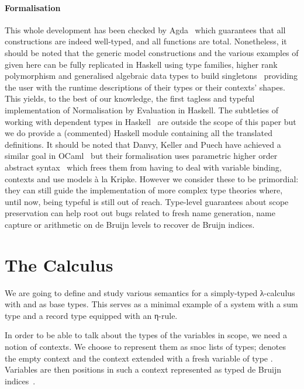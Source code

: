 \paragraph{Formalisation} This whole development has been checked by Agda~\cite{norell2009dependently}
which guarantees that all constructions are indeed well-typed, and all functions are
total. Nonetheless, it should be noted that the generic model constructions and the
various examples of  given here can be fully replicated in Haskell using
type families, higher rank polymorphism and generalised algebraic data types to build
singletons~\cite{eisenberg2013dependently} providing the user with the runtime descriptions
of their types or their contexts' shapes. This yields, to the best of our knowledge, the
first tagless and typeful implementation of Normalisation by Evaluation in Haskell. The
subtleties of working with dependent types in Haskell~\cite{lindley2014hasochism} are
outside the scope of this paper but we do provide a (commented) Haskell module containing
all the translated definitions. It should be noted that Danvy, Keller and Puech have achieved
a similar goal in OCaml~\cite{danvytagless} but their formalisation uses parametric higher
order abstract syntax~\cite{chlipala2008parametric} which frees them from having to deal
with variable binding, contexts and use models à la Kripke. However we consider these to be
primordial: they can still guide the implementation of more complex type theories where,
until now, being typeful is still out of reach. Type-level guarantees about scope preservation
can help root out bugs related to fresh name generation, name capture or arithmetic on de
Bruijn levels to recover de Bruijn indices.

\section{The Calculus}

We are going to define and study various semantics for a simply-typed λ-calculus
with  and  as base types. This serves as a minimal example
of a system with a sum type and a record type equipped with an η-rule.


In order to be able to talk about the types of the variables in scope, we
need a notion of contexts. We choose to represent them as snoc lists of
types;  denotes the empty context and    the
context  extended with a fresh variable of type . Variables
are then positions in such a context represented as typed de Bruijn
indices~\cite{de1972lambda}.

